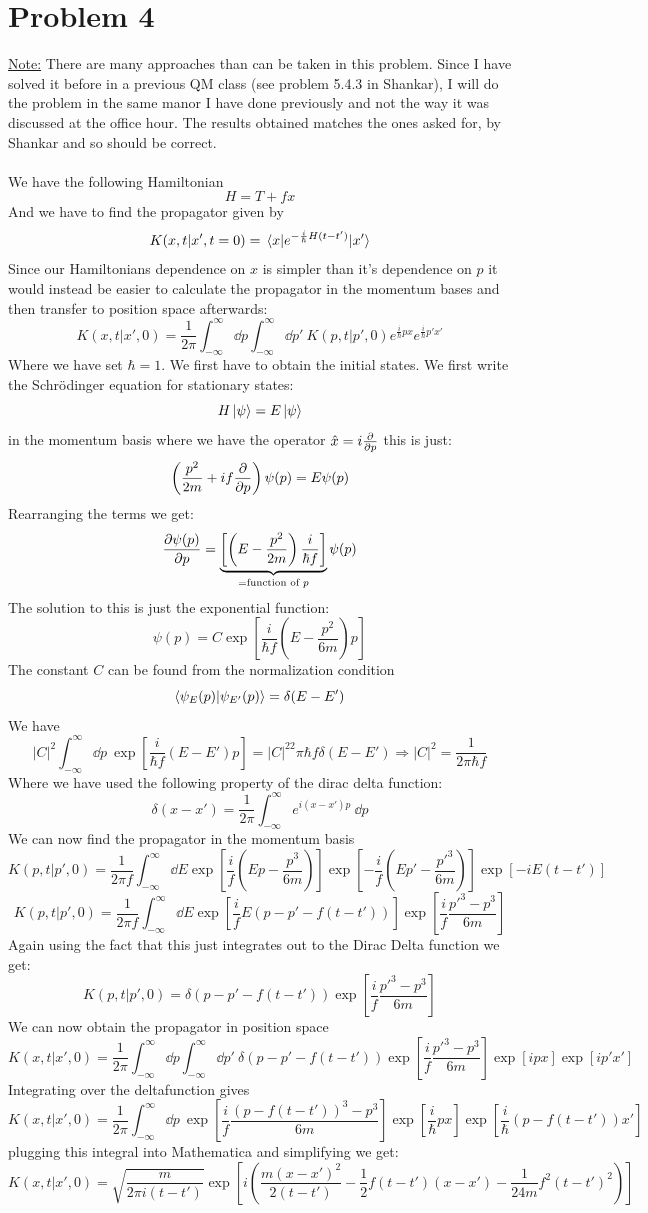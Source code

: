 \documentclass[a4paper,11pt]{article}
\newcommand{\be}{\begin{equation}}
\newcommand{\ee}{\end{equation}}
\newcommand{\ham}{H}
\newcommand{\kin}{T}
\begin{document}
\section*{Problem 4}
\underline{Note:} There are many approaches than can be taken in this problem. Since I have solved it before in a previous QM class (see problem 5.4.3 in Shankar), I will do the problem in the same manor I have done previously and not the way it was discussed at the office hour. The results obtained matches the ones asked for, by Shankar and so should be correct.\\\\
We have the following Hamiltonian
\be
\ham=\kin+fx
\ee
And we have to find the propagator given by
\be
K(x,t|x',t=0)=\mel{x}{e^{-\frac{i}{\hbar}\ham (t-t')}}{x'}
\ee
Since our Hamiltonians dependence on $x$ is simpler than it's dependence on $p$ it would instead be easier to calculate the propagator in the momentum bases and then transfer to position space afterwards:
\[
K(x,t|x',0)=\frac{1}{2\pi}\int^{\infty}_{-\infty}\dd p\int^{\infty}_{-\infty}\dd p'\: K(p,t|p',0)e^{\frac{i}{\hbar}px}e^{\frac{i}{\hbar}p'x'}
\]
Where we have set $\hbar=1$. We first have to obtain the initial states. We first write the Schrödinger equation for stationary states:
\be
\ham\ket{\psi}=E\ket{\psi}
\ee
in the momentum basis where we have the operator $\hat{x}=i\pdv{}{p}$ this is just:
\be
\left(\frac{p^2}{2m}+if \pdv{}{p}\right)\psi(p)=E\psi(p)
\ee
Rearranging the terms we get:
\[
\pdv{\psi(p)}{p}= \underbrace{\left[\left( E-\frac{p^2}{2m} \right)\frac{i}{\hbar f}\right]}_{=\text{function of } p}\psi(p)
\]
The solution to this is just the exponential function:
\[
\psi(p)=C\exp[\frac{i}{\hbar f}\left( E-\frac{p^2}{6m} \right)p]
\]
The constant $C$ can be found from the normalization condition
\be
\braket{\psi_E(p)}{\psi_{E'}(p)}=\delta(E-E')
\ee
We have
\[
|C|^2\int^{\infty}_{-\infty}\dd p\:\exp[\frac{i}{\hbar f}\left( E-E' \right)p]
=|C|^22\pi\hbar f\delta(E-E')\Rightarrow |C|^2=\frac{1}{2\pi\hbar f}
\]
Where we have used the following property of the dirac delta function:
\[
\delta(x-x')=\frac{1}{2\pi}\int^{\infty}_{-\infty}e^{i(x-x')p}\:\dd p
\]
We can now find the propagator in the momentum basis
\[
K(p,t|p',0)=\frac{1}{2\pi f}\int^{\infty}_{-\infty}\dd E \exp[\frac{i}{ f}\left( Ep-\frac{p^3}{6m} \right)]\exp[-\frac{i}{ f}\left( Ep'-\frac{p'^3}{6m} \right)]\exp[-iE(t-t')]
\]
\[
K(p,t|p',0)=\frac{1}{2\pi f}\int^{\infty}_{-\infty}\dd E \exp[\frac{i}{ f}E\left( p-p'-f(t-t') \right)]\exp[\frac{i}{ f}\frac{p'^3-p^3}{6m}]
\]
Again using the fact that this just integrates out to the Dirac Delta function we get:
\[
K(p,t|p',0)=\delta (p-p'-f(t-t'))\exp[\frac{i}{f}\frac{p'^3-p^3}{6m}]
\]
We can now obtain the propagator in position space
\[
K(x,t|x',0)=\frac{1}{2\pi}\int^{\infty}_{-\infty}\dd p\int^{\infty}_{-\infty}\dd p'\:\delta (p-p'-f(t-t'))\exp[\frac{i}{ f}\frac{p'^3-p^3}{6m}]\exp[ipx]\exp[ip'x'
]
\]
Integrating over the deltafunction gives
\[
K(x,t|x',0)=\frac{1}{2\pi}\int^{\infty}_{-\infty}\dd p\:\exp[\frac{i}{ f}\frac{(p-f(t-t'))^3-p^3}{6m}]\exp[\frac{i}{\hbar}px]\exp[\frac{i}{\hbar}(p-f(t-t'))x'
]
\]
plugging this integral into Mathematica and simplifying we get:
\[
K(x,t|x',0)=\sqrt{\frac{m}{2\pi i (t-t')}}\exp[i\left( \frac{m(x-x')^2}{2(t-t')}-\frac{1}{2}f(t-t')(x-x')-\frac{1}{24m}f^2(t-t')^2 \right)]
\]
\end{document}
